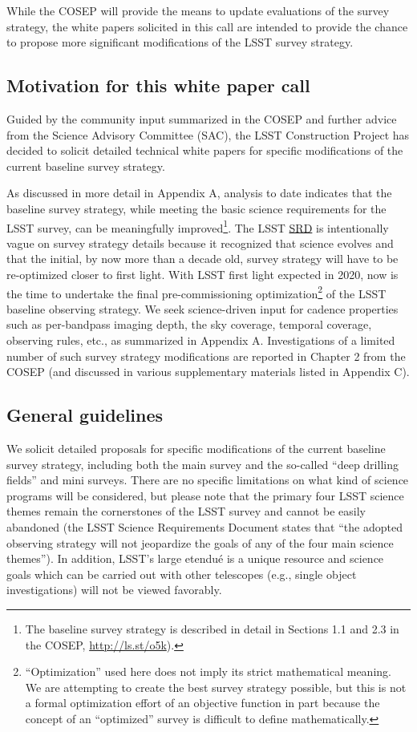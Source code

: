 \documentclass[DM,lsstdraft,toc,usenatbib]{lsstdoc}
\begin{document}
While the COSEP will provide the means to update evaluations of the survey strategy, the white papers solicited in this call are 
intended to provide the chance to propose more significant modifications of the LSST survey strategy. 

\subsection{Motivation for this white paper call}

Guided by the community input summarized in the COSEP and further 
advice from the Science Advisory Committee (SAC), the LSST Construction Project has decided to
solicit detailed technical white papers for specific modifications of the current baseline survey strategy.

As discussed in more detail in Appendix A, analysis to date indicates that the baseline 
survey strategy, while meeting the basic science requirements for the LSST survey, can be meaningfully 
improved\footnote{The baseline survey strategy is described in detail in Sections 1.1 and 2.3 in the COSEP, \href{http://ls.st/o5k}{http://ls.st/o5k}).}.
The LSST \href{http://ls.st/srd}{SRD}
is intentionally vague on survey strategy details because it recognized that science evolves and that the 
initial, by now more than a decade old, survey strategy will have to be re-optimized closer to first 
light. With LSST first light expected in 2020, now is the time to undertake the final pre-commissioning
optimization\footnote{``Optimization'' used here does not imply its strict mathematical meaning. 
We are attempting to create the best survey strategy possible, but this is not a formal optimization 
effort of an objective function in part because the concept of an ``optimized'' survey is difficult to 
define mathematically.} 
of the LSST baseline observing strategy. We seek science-driven input for cadence 
properties such as per-bandpass imaging depth, the sky coverage, temporal coverage, observing
rules, etc., as summarized in Appendix A. Investigations of a limited number of such survey strategy 
modifications are reported in Chapter 2 from the COSEP (and discussed 
in various supplementary materials listed in Appendix C). 


\subsection{General guidelines} 

We solicit detailed proposals for specific modifications of the current baseline survey strategy, including 
both the main survey and the so-called ``deep drilling fields'' and mini surveys. There are no 
specific limitations on what kind of science programs will be considered, but please note that 
the primary four LSST science themes remain the cornerstones of the LSST survey and cannot 
be easily abandoned (the LSST Science Requirements Document states that ``the adopted observing 
strategy will not jeopardize the goals of any of the four main science themes''). In addition, 
LSST's large etendu\'e is a unique resource and science goals which can be carried out with other 
telescopes (e.g., single object investigations) will not be viewed favorably.
\end{document}
